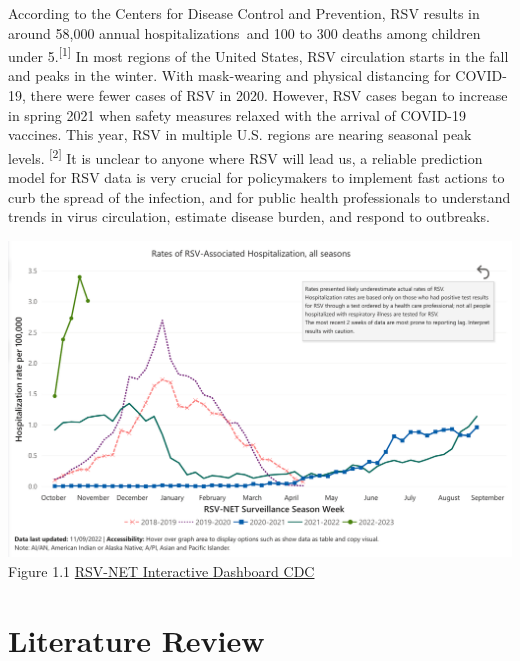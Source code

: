 \documentclass[
  letterpaper,
  DIV=11,
  numbers=noendperiod]{scrreport}
\begin{document}
According to the Centers for Disease Control and Prevention, RSV results
in around 58,000 annual hospitalizations~and 100 to 300 deaths among
children under 5.\textsuperscript{{[}1{]}} In most regions of the United
States, RSV circulation starts in the fall and peaks in the winter. With
mask-wearing and physical distancing for COVID-19, there were fewer
cases of RSV in 2020. However, RSV cases began to increase in spring
2021 when safety measures relaxed with the arrival of COVID-19 vaccines.
This year, RSV in multiple U.S. regions are nearing seasonal peak
levels. \textsuperscript{{[}2{]}} It is unclear to anyone where RSV will
lead us, a reliable prediction model for RSV data is very crucial for
policymakers to implement fast actions to curb the spread of the
infection, and for public health professionals to understand trends in
virus circulation, estimate disease burden, and respond to outbreaks.

\includegraphics{./images/paste-84838FB2.png}\\

Figure 1.1
\href{https://www.cdc.gov/rsv/research/rsv-net/dashboard.html}{RSV-NET
Interactive Dashboard \textbar{} CDC}

\hypertarget{literature-review}{%
\section{Literature Review}\label{literature-review}}
\end{document}
